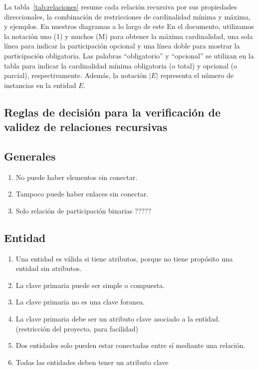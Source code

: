     La tabla~\ref{tab:relaciones} resume cada relación recursiva por sus propiedades direccionales, la combinación de restricciones de cardinalidad mínima y máxima, y ejemplos. En nuestros diagramas a lo largo de este En el documento, utilizamos la notación uno (1) y muchos (M) para obtener la máxima cardinalidad, una sola línea para indicar la participación opcional y una línea doble para mostrar la participación obligatoria. Las palabras ``obligatorio'' y ``opcional'' se utilizan en la tabla para indicar la cardinalidad mínima obligatoria (o total) y opcional (o parcial), respectivamente. Además, la notación $|E|$ representa el número de instancias en la entidad $E$.

\subsection{Reglas de decisión para la verificación de validez de relaciones recursivas}






\subsection{Generales}
\begin{enumerate}
    \item No puede haber elementos sin conectar.
    \item Tampoco puede haber enlaces sin conectar.
    \item Solo relación de participación binarias ?????
\end{enumerate}



\subsection{Entidad}
\begin{enumerate}
    \item Una entidad es válida si tiene atributos, porque no tiene propósito una entidad sin atributos.
    \item La clave primaria puede ser simple o compuesta.
    \item La clave primaria no es una clave foranea.
    \item La clave primaria debe ser un atributo clave asociado a la entidad. (restricción del proyecto, para facilidad)
    \item Dos entidades solo pueden estar conectadas entre sí mediante una relación.
    \item Todas las entidades deben tener un atributo clave
\end{enumerate}

